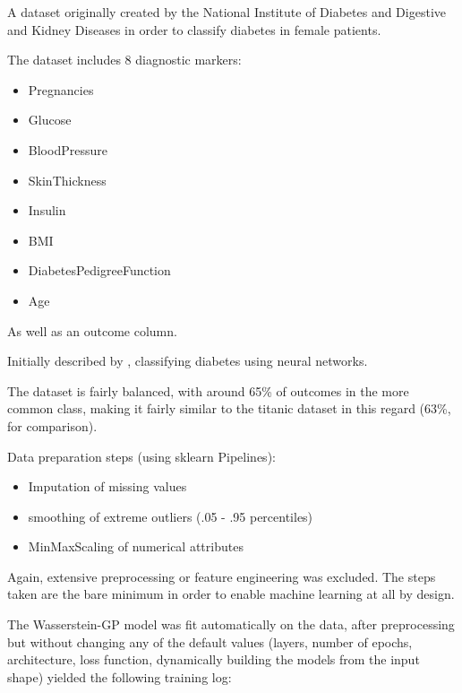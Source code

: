 A dataset originally created by the National Institute of Diabetes and Digestive and Kidney Diseases in order to classify diabetes
in female patients. 

The dataset includes 8 diagnostic markers:
\begin{itemize}
	\item Pregnancies
	\item Glucose
	\item BloodPressure
	\item SkinThickness
	\item Insulin
	\item BMI 
	\item DiabetesPedigreeFunction
	\item Age	
\end{itemize}

As well as an outcome column.

Initially described by \cite{diabetes}, classifying diabetes using neural networks.

The dataset is fairly balanced, with around 65\% of outcomes in the more common class, making it fairly similar to the titanic dataset in this regard (63\%, for comparison).

Data preparation steps (using sklearn Pipelines):
\begin{itemize}
	\item Imputation of missing values
	\item smoothing of extreme outliers (.05 - .95 percentiles)
	\item MinMaxScaling of numerical attributes
\end{itemize}

Again, extensive preprocessing or feature engineering was excluded. The steps taken are the bare minimum in order to enable machine learning at all by design.

\clearpage

The Wasserstein-GP model was fit automatically on the data, after preprocessing but without changing any of the default values (layers, number of epochs, architecture, loss function, dynamically building the models from the input shape) yielded the following training log:


\pagebreak

